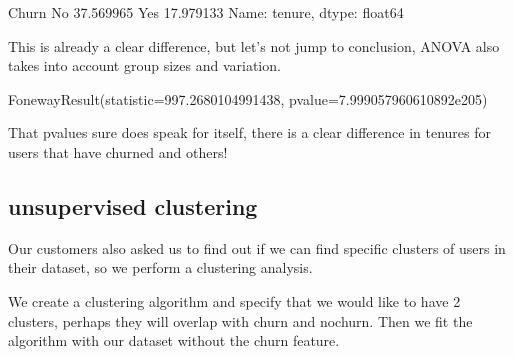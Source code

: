 \documentclass[letterpaper,10pt,english]{jupyterBook}
\begin{document}
\begin{sphinxVerbatim}[commandchars=\\\{\}]
Churn
No     37.569965
Yes    17.979133
Name: tenure, dtype: float64
\end{sphinxVerbatim}

\sphinxAtStartPar
This is already a clear difference, but let’s not jump to conclusion, ANOVA also takes into account group sizes and variation.

\begin{sphinxVerbatim}[commandchars=\\\{\}]
    \PYG{p}{[}\PYG{p}{]} 
    \PYG{p}{[}\PYG{p}{]}
\end{sphinxVerbatim}

\begin{sphinxVerbatim}[commandchars=\\\{\}]
F\PYGZus{}onewayResult(statistic=997.2680104991438, pvalue=7.999057960610892e\PYGZhy{}205)
\end{sphinxVerbatim}

\sphinxAtStartPar
That p\sphinxhyphen{}values sure does speak for itself, there is a clear difference in tenures for users that have churned and others!


\subsection{unsupervised clustering}
\label{\detokenize{c7_case_studies/Churn:unsupervised-clustering}}
\sphinxAtStartPar
Our customers also asked us to find out if we can find specific clusters of users in their dataset, so we perform a clustering analysis.

\begin{sphinxVerbatim}[commandchars=\\\{\}]
   
\end{sphinxVerbatim}

\sphinxAtStartPar
We create a clustering algorithm and specify that we would like to have 2 clusters, perhaps they will overlap with churn and nochurn. Then we fit the algorithm with our dataset without the churn feature.
\end{document}
